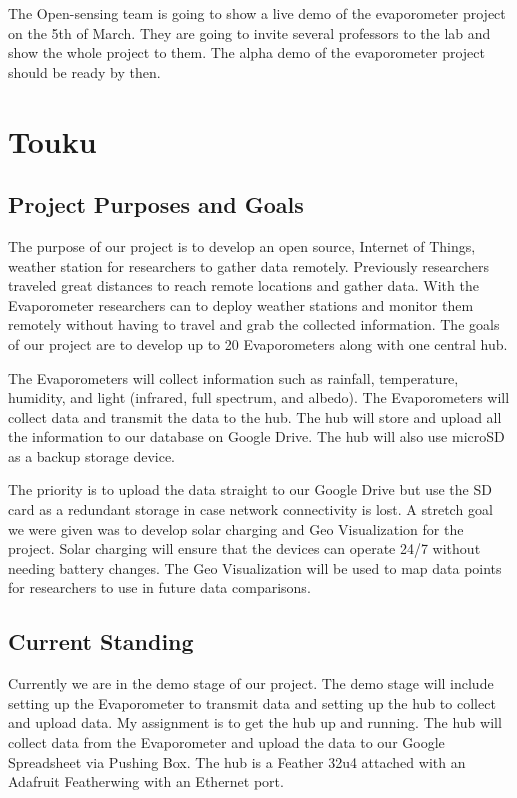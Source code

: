 \documentclass[onecolumn, draftclsnofoot,10pt, compsoc]{IEEEtran}
\begin{document}
The Open-sensing team is going to show a live demo of the evaporometer project on the 5th of March. They are going to invite several professors to the lab and show the whole project to them. The alpha demo of the evaporometer project should be ready by then.
\section{Touku}
\subsection{Project Purposes and Goals}
The purpose of our project is to develop an open source, Internet of Things, weather station for researchers to gather data remotely.  Previously researchers traveled great distances to reach remote locations and gather data. With the Evaporometer researchers can to deploy weather stations and monitor them remotely without having to travel and grab the collected information.  The goals of our project are to develop up to 20 Evaporometers along with one central hub.

The Evaporometers will collect information such as rainfall, temperature, humidity,  and light (infrared, full spectrum, and albedo). The Evaporometers will collect data and transmit the data to the hub.  The hub will store and upload all the information to our database on Google Drive.  The hub will also use microSD as a backup storage device.

The priority is to upload the data straight to our Google Drive but use the SD card as a redundant storage in case network connectivity is lost.  A stretch goal we were given was to develop solar charging and Geo Visualization for the project.  Solar charging will ensure that the devices can operate 24/7 without needing battery changes.  The Geo Visualization will be used to map data points for researchers to use in future data comparisons.\\

\subsection{Current Standing}
Currently we are in the demo stage of our project.  The demo stage will include setting up the Evaporometer to transmit data and setting up the hub to collect and upload data.  My assignment is to get the hub up and running.  The hub will collect data from the Evaporometer and upload the data to our Google Spreadsheet via Pushing Box.  The hub is a Feather 32u4 attached with an Adafruit Featherwing with an Ethernet port. 
\end{document}
